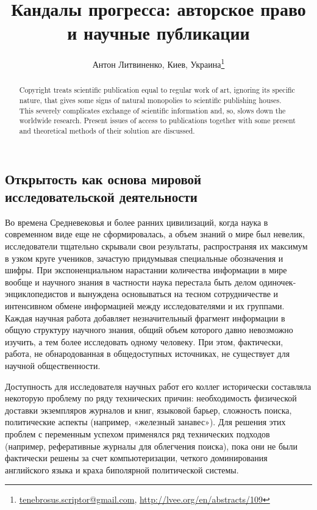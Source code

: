 \documentclass [10pt, a5paper]{article}
\begin{document}
\title{Кандалы прогресса: авторское право и научные публикации}
\author{Антон Литвиненко, Киев, Украина\footnote{\url{tenebrosus.scriptor@gmail.com}, \url{http://lvee.org/en/abstracts/109}}}
\maketitle
\begin{abstract}
Copyright treats scientific publication equal to regular work of art, ignoring its specific nature, that gives some signs of natural monopolies to scientific publishing houses. This severely compli\-cates exchange of scientific information and, so, slows down the worldwide research. Present issues of access to publications to\-gether with some present and theoretical methods of their solu\-tion are discussed.
\end{abstract}
\subsection*{Открытость как основа мировой исследовательской деятельности}

Во времена Средневековья и более ранних цивилизаций, когда наука в современном виде еще не сформировалась, а объем знаний о мире был невелик, исследователи тщательно скрывали свои результаты, распространяя их максимум в узком круге учеников, зачастую придумывая специальные обозначения и шифры. При экспоненциальном нарастании количества информации в мире вообще и научного знания в частности наука перестала быть делом одиночек-энциклопедистов и вынуждена основываться на тесном сотрудничестве и интенсивном обмене информацией между исследователями и их группами. Каждая научная работа добавляет незначительный фрагмент информации в общую структуру научного знания, общий объем которого давно невозможно изучить, а тем более исследовать одному человеку. При этом, фактически, работа, не обнародованная в общедоступных источниках, не существует для научной общественности.

Доступность для исследователя научных работ его коллег исторически составляла некоторую проблему по ряду технических причин: необходимость физической доставки экземпляров журналов и книг, языковой барьер, сложность поиска, политические аспекты (например, «железный занавес»). Для решения этих проблем с переменным успехом применялся ряд технических подходов (например, реферативные журналы для облегчения поиска), пока они не были фактически решены за счет компьютеризации, четкого доминирования английского языка и краха биполярной политической системы.
\end{document}
